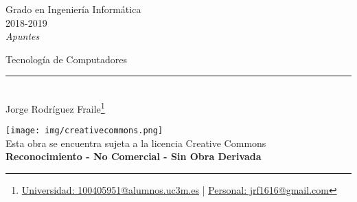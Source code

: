 \documentclass[12pt, twoside, openright]{report} %
\begin{document}
	
\begin{titlepage}
	\begin{sffamily}
	\color{azulUC3M}
	\begin{center}
		\begin{figure}[H] %
		\end{figure}
		\vspace{2.5cm}
		\begin{Large}
			Grado en Ingeniería Informática\\			
			2018-2019\\
			\vspace{2cm}		
			\textsl{Apuntes}\\
			\bigskip
		\end{Large}
		 	{\Huge Tecnología de Computadores}\\
		 	\vspace*{0.5cm}
	 		\rule{10.5cm}{0.1mm}\\
			\vspace*{0.9cm}
			{\LARGE Jorge Rodríguez Fraile\footnote{\href{mailto:100405951@alumnos.uc3m.es}{Universidad: 100405951@alumnos.uc3m.es}  |  \href{mailto:jrf1616@gmail.com}{Personal: jrf1616@gmail.com}}}\\ 
			\vspace*{1cm}
	\end{center}
	\vfill
	\color{black}
		\texttt{[image: img/creativecommons.png]}\\
		Esta obra se encuentra sujeta a la licencia Creative Commons\\ \textbf{Reconocimiento - No Comercial - Sin Obra Derivada}
	\end{sffamily}
\end{titlepage}


\tableofcontents
\thispagestyle{fancy}




\end{document}
